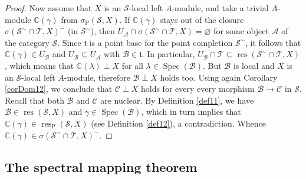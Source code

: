 \documentclass[12pt]{amsart}%
\theoremstyle{plain}
\numberwithin{equation}{section}
\numberwithin{equation}{section}
\numberwithin{theorem}{section}
\numberwithin{lemma}{section}
\numberwithin{remark}{section}
\numberwithin{example}{section}
\numberwithin{proposition}{section}
\numberwithin{definition}{section}
\numberwithin{corollary}{section}
\begin{document}
\begin{proof}
Now assume that $X$ is an $\mathcal{S}$-local left $A$-module, and take a
trivial $A$-module $\mathbb{C}\left(  \gamma\right)  $ from $\sigma
_{\operatorname{P}}\left(  \mathcal{S},X\right)  $. If $\mathbb{C}\left(
\gamma\right)  $ stays out of the closure $\sigma\left(  \mathcal{S}^{\sim
}\cap\mathcal{T},X\right)  ^{-}$ (in $\mathcal{S}^{\sim}$), then
$U_{\mathcal{A}}\cap\sigma\left(  \mathcal{S}^{\sim}\cap\mathcal{T},X\right)
=\varnothing$ for some object $\mathcal{A}$ of the category $\mathcal{S}$.
Since $\mathfrak{t}$ is a point base for the point completion $\mathcal{S}%
^{\sim}$, it follows that $\mathbb{C}\left(  \gamma\right)  \in U_{\mathcal{B}%
}$ and $U_{\mathcal{B}}\subseteq U_{\mathcal{A}}$ with $\mathcal{B}%
\in\mathfrak{t}$. In particular, $U_{\mathcal{B}}\cap\mathcal{T\subseteq
}\operatorname{res}\left(  \mathcal{S}^{\sim}\cap\mathcal{T},X\right)  $,
which means that $\mathbb{C}\left(  \lambda\right)  \perp X$ for all
$\lambda\in\operatorname{Spec}\left(  \mathcal{B}\right)  $. But $\mathcal{B}$
is local and $X$ is an $\mathcal{S}$-local left $A$-module, therefore
$\mathcal{B}\perp X$ holds too. Using again Corollary \ref{corDom12}, we
conclude that $\mathcal{C}\perp X$ holds for every every morphism
$\mathcal{B\rightarrow C}$ in $\mathcal{S}$. Recall that both $\mathcal{B}$
and $\mathcal{C}$ are nuclear. By Definition \ref{def11}, we have
$\mathcal{B\in}\operatorname{res}\left(  \mathcal{S},X\right)  $ and
$\gamma\in\operatorname{Spec}\left(  \mathcal{B}\right)  $, which in turn
implies that $\mathbb{C}\left(  \gamma\right)  \in\operatorname{res}%
_{\operatorname{P}}\left(  \mathcal{S},X\right)  $ (see Definition
\ref{def12}), a contradiction. Whence $\mathbb{C}\left(  \gamma\right)
\in\sigma\left(  \mathcal{S}^{\sim}\cap\mathcal{T},X\right)  ^{-}$.
\end{proof}

\subsection{The spectral mapping theorem}
\end{document}
